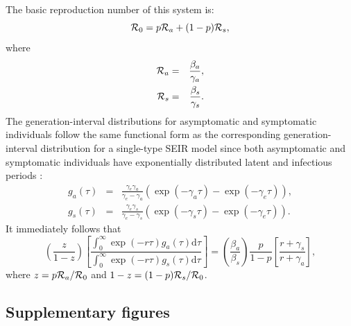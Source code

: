 The basic reproduction number of this system is:
\begin{equation}
{\cal{R}}_{0}= p {\cal{R}}_a + (1-p) {\cal{R}}_s,
\end{equation}
where 
\begin{eqnarray}
{\cal{R}}_a &=& \frac{\beta_a}{\gamma_a},\\
{\cal{R}}_s &=& \frac{\beta_s}{\gamma_s}.
\end{eqnarray}
The generation-interval distributions for asymptomatic and symptomatic individuals follow the same functional form as the corresponding generation-interval distribution for a single-type SEIR model since both asymptomatic and symptomatic individuals have exponentially distributed latent and infectious periods \citep{svensson2015influence}:
\begin{eqnarray}
g_a(\tau) &=& \frac{\gamma_e \gamma_a}{\gamma_e - \gamma_a} \left(\exp(-\gamma_a \tau) - \exp(-\gamma_e \tau)\right),\\
g_s(\tau) &=& \frac{\gamma_e \gamma_s}{\gamma_e - \gamma_s} \left(\exp(-\gamma_s \tau) - \exp(-\gamma_e \tau)\right).
\end{eqnarray}
It immediately follows that 
\begin{equation}
\left(\frac{z}{1-z}\right)\left[\frac{\int_0^\infty \exp(-r\tau) g_a(\tau) \mathrm{d}\tau}{\int_0^\infty \exp(-r\tau) g_s(\tau) \mathrm{d}\tau}\right] = \left(\frac{\beta_a}{\beta_s}\right)\frac{p}{1-p}\left[\frac{r+\gamma_s}{r+\gamma_a}\right],
\end{equation}
where $z = p {\cal{R}}_a/{\cal{R}}_{0}$ and $1-z=(1-p) {\cal{R}}_s/{\cal{R}}_{0}$.

\pagebreak

\subsection*{Supplementary figures}

